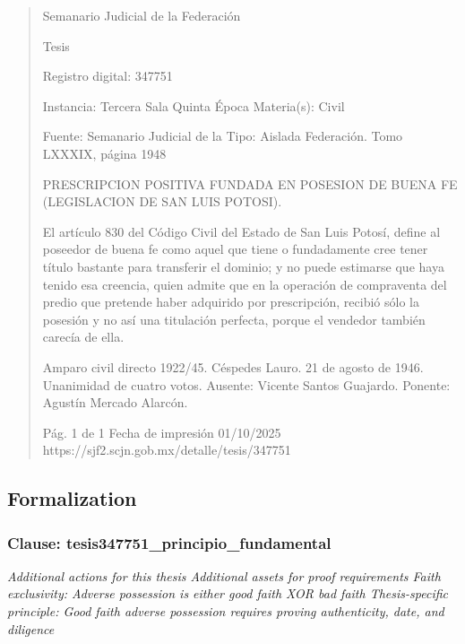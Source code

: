 \documentclass[11pt,a4paper]{article}
\begin{document}
\begin{quote}
                                                   Semanario Judicial de la Federación

                                                  Tesis

 Registro digital: 347751

 Instancia: Tercera Sala          Quinta Época                          Materia(s): Civil

                                  Fuente: Semanario Judicial de la      Tipo: Aislada
                                  Federación.
                                  Tomo LXXXIX, página 1948


PRESCRIPCION POSITIVA FUNDADA EN POSESION DE BUENA FE (LEGISLACION DE SAN
LUIS POTOSI).


El artículo 830 del Código Civil del Estado de San Luis Potosí, define al poseedor de buena fe como
aquel que tiene o fundadamente cree tener título bastante para transferir el dominio; y no puede
estimarse que haya tenido esa creencia, quien admite que en la operación de compraventa del
predio que pretende haber adquirido por prescripción, recibió sólo la posesión y no así una titulación
perfecta, porque el vendedor también carecía de ella.


Amparo civil directo 1922/45. Céspedes Lauro. 21 de agosto de 1946. Unanimidad de cuatro votos.
Ausente: Vicente Santos Guajardo. Ponente: Agustín Mercado Alarcón.




                                             Pág. 1 de 1             Fecha de impresión 01/10/2025
  https://sjf2.scjn.gob.mx/detalle/tesis/347751

\end{quote}

\subsection{Formalization}

\subsubsection{Clause: tesis347751\_principio\_fundamental}

\textit{Additional actions for this thesis Additional assets for proof requirements Faith exclusivity: Adverse possession is either good faith XOR bad faith Thesis-specific principle: Good faith adverse possession requires proving authenticity, date, and diligence}
\end{document}
